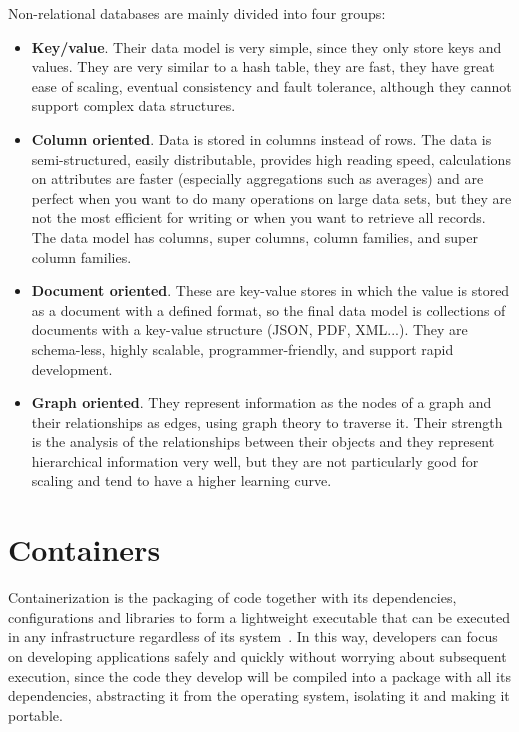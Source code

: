 \nonzeroparskip Non-relational databases are mainly divided into four groups:
\begin{itemize}
	\item \textbf{Key/value}. Their data model is very simple, since they only store keys and values. They are very similar to a hash table, they are fast, they have great ease of scaling, eventual consistency and fault tolerance, although they cannot support complex data structures.
	\item \textbf{Column oriented}. Data is stored in columns instead of rows. The data is semi-structured, easily distributable, provides high reading speed, calculations on attributes are faster (especially aggregations such as averages) and are perfect when you want to do many operations on large data sets, but they are not the most efficient for writing or when you want to retrieve all records. The data model has columns, super columns, column families, and super column families.
	\item \textbf{Document oriented}. These are key-value stores in which the value is stored as a document with a defined format, so the final data model is collections of documents with a key-value structure (JSON, PDF, XML...). They are schema-less, highly scalable, programmer-friendly, and support rapid development.
	\item \textbf{Graph oriented}. They represent information as the nodes of a graph and their relationships as edges, using graph theory to traverse it. Their strength is the analysis of the relationships between their objects and they represent hierarchical information very well, but they are not particularly good for scaling and tend to have a higher learning curve.
\end{itemize}

\section{Containers}

\nonzeroparskip Containerization is the packaging of code together with its dependencies, configurations and libraries to form a lightweight executable that can be executed in any infrastructure regardless of its system~\cite{ibm_containerization}. In this way, developers can focus on developing applications safely and quickly without worrying about subsequent execution, since the code they develop will be compiled into a package with all its dependencies, abstracting it from the operating system, isolating it and making it portable.

